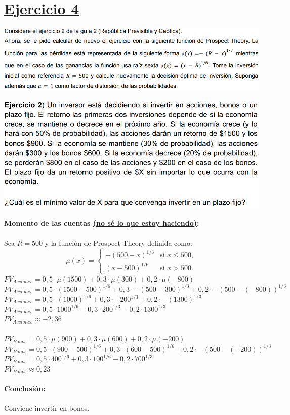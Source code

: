 \documentclass{article}
\newcommand{\ulcolor}[2][Red]{\setulcolor{#1}\ul{#2}}
\begin{document}
    \section*{\underline{Ejercicio 4}}
      \begin{center}
        \includegraphics[width=0.8  \linewidth]{figs/adicionales-faciles-cuatro.png}
      \end{center}
      \begin{center}
        \includegraphics[width=0.8  \linewidth]{figs/adicionales-faciles-cuatro-b.png}
      \end{center}
      \textbf{Momento de las cuentas \ulcolor[Red]{(no sé lo que estoy haciendo)}:}
      \\
      \\
      Sea \(R = 500\) y la función de Prospect Theory definida como:
      \[
        \mu(x) =
        \begin{cases} 
          -(500-x)^{1/3} & \text{si } x \leq 500, \\ 
          (x-500)^{1/6} & \text{si } x > 500.
        \end{cases}
      \]
      \(PV_{Acciones} = 0,5 \cdot \mu(1500) + 0,3 \cdot \mu(300) + 0,2 \cdot \mu(-800)\) \\
      \(PV_{Acciones} = 0,5 \cdot (1500-500)^{1/6} + 0,3 \cdot -(500 - 300)^{1/3} + 0,2 \cdot -(500 - (-800))^{1/3}\) \\
      \(PV_{Acciones} = 0,5 \cdot (1000)^{1/6} + 0,3 \cdot -200^{1/3} + 0,2 \cdot -(1300)^{1/3}\) \\
      \(PV_{Acciones} = 0,5 \cdot 1000^{1/6} - 0,3 \cdot 200^{1/3} - 0,2 \cdot 1300^{1/3}\) \\
      \(PV_{Acciones} \approx -2,36\) \\
      \\
      \(PV_{Bonos} = 0,5 \cdot \mu(900) + 0,3 \cdot \mu(600) + 0,2 \cdot \mu(-200)\) \\
      \(PV_{Bonos} = 0,5 \cdot (900-500)^{1/6} + 0,3 \cdot (600-500)^{1/6} + 0,2 \cdot -(500-(-200))^{1/3}\) \\
      \(PV_{Bonos} = 0,5 \cdot 400^{1/6} + 0,3 \cdot 100^{1/6} - 0,2 \cdot 700^{1/3}\) \\
      \(PV_{Bonos} \approx 0,23\) \\
      \\
      \textbf{Conclusión:}
      \\
      \\
      Conviene invertir en bonos.  
\end{document}

